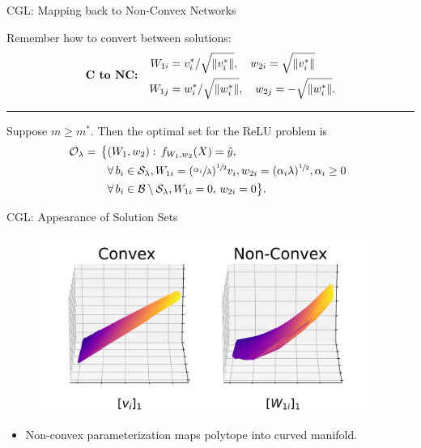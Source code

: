 \documentclass[usenames,dvipsnames,mathserif,notheorems]{beamer}
\newcommand{\horizontalrule}{
	{
			\vspace{-0.5em}
			\center \rule{\textwidth}{0.1em}
			\vspace{-0.2em}
		}
}
\begin{document}
\begin{frame}{CGL: Mapping back to Non-Convex Networks}

	Remember how to convert between solutions:
	\begin{equation*}
		\textbf{C to NC:} \quad
		\begin{aligned}
			W_{1i} & = v_i^*/ \sqrt{\|v_i^*\|}, \quad w_{2i} = \sqrt{\|v_i^*\|}
			\\
			W_{1j} & = w_i^*/ \sqrt{\|w_i^*\|}, \quad w_{2j} = -\sqrt{\|w_i^*\|}.
		\end{aligned}
	\end{equation*}

	\pause
	\horizontalrule

	\begin{corollary}[Informal]
		Suppose \( m \geq m^* \).
		Then the optimal set for the ReLU problem is
		\vspace{-1ex}
		\begin{equation*}
			\begin{aligned}
				\hspace{-0.5em} \mathcal{O}_\lambda  = \,
				\big\{
				 & (W_1,  w_2) :
				\, f_{W_1, w_2}(X)  =  \hat y,                        \\
				 & \forall \, {b_i}  \in  \mathcal{S}_\lambda,
				W_{1i} = (\sfrac{\alpha_{i}}{\lambda})^{\sfrac{1}{2}} v_i,
				w_{2i} = (\alpha_i \lambda)^{\sfrac{1}{2}},
				\alpha_i \geq 0                                       \\
				 & \forall \, {b_i}  \in \mathcal{B} \setminus \mathcal{S}_\lambda,
				W_{1i} = 0, \, w_{2i} = 0
				\big\}.
			\end{aligned}
		\end{equation*}
	\end{corollary}

\end{frame}

\begin{frame}{CGL: Appearance of Solution Sets}
	\begin{figure}[]
		\centering
		\includegraphics[width=0.96\textwidth]{assets/solution_sets_vis_270.png}
	\end{figure}

	\begin{itemize}
		\item Non-convex parameterization maps polytope into curved
		      manifold.
	\end{itemize}


\end{frame}
\end{document}
